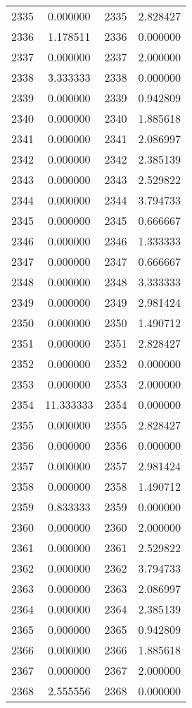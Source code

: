 \documentclass[12pt]{article}
\begin{document}
\begin{longtable}{@{}cccc@{}}
2335 & 0.000000 & 2335 & 2.828427 \\
2336 & 1.178511 & 2336 & 0.000000 \\
2337 & 0.000000 & 2337 & 2.000000 \\
2338 & 3.333333 & 2338 & 0.000000 \\
2339 & 0.000000 & 2339 & 0.942809 \\
2340 & 0.000000 & 2340 & 1.885618 \\
2341 & 0.000000 & 2341 & 2.086997 \\
2342 & 0.000000 & 2342 & 2.385139 \\
2343 & 0.000000 & 2343 & 2.529822 \\
2344 & 0.000000 & 2344 & 3.794733 \\
2345 & 0.000000 & 2345 & 0.666667 \\
2346 & 0.000000 & 2346 & 1.333333 \\
2347 & 0.000000 & 2347 & 0.666667 \\
2348 & 0.000000 & 2348 & 3.333333 \\
2349 & 0.000000 & 2349 & 2.981424 \\
2350 & 0.000000 & 2350 & 1.490712 \\
2351 & 0.000000 & 2351 & 2.828427 \\
2352 & 0.000000 & 2352 & 0.000000 \\
2353 & 0.000000 & 2353 & 2.000000 \\
2354 & 11.333333 & 2354 & 0.000000 \\
2355 & 0.000000 & 2355 & 2.828427 \\
2356 & 0.000000 & 2356 & 0.000000 \\
2357 & 0.000000 & 2357 & 2.981424 \\
2358 & 0.000000 & 2358 & 1.490712 \\
2359 & 0.833333 & 2359 & 0.000000 \\
2360 & 0.000000 & 2360 & 2.000000 \\
2361 & 0.000000 & 2361 & 2.529822 \\
2362 & 0.000000 & 2362 & 3.794733 \\
2363 & 0.000000 & 2363 & 2.086997 \\
2364 & 0.000000 & 2364 & 2.385139 \\
2365 & 0.000000 & 2365 & 0.942809 \\
2366 & 0.000000 & 2366 & 1.885618 \\
2367 & 0.000000 & 2367 & 2.000000 \\
2368 & 2.555556 & 2368 & 0.000000 \\

\end{longtable}
\end{document}
